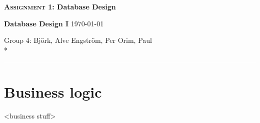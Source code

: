 \documentclass[a4paper, pagesize, parskip=half]{scrartcl}
\begin{document}
\Huge \textbf{\textsc{Assignment 1}: Database Design}

\Large \textbf{Database Design I} \quad \large \today

\normalsize Group 4: \quad Björk, Alve  \quad Engström, Per \quad Orim, Paul \\*
\rule{\textwidth}{1pt}

\bigskip

\section*{Business logic}

<business stuff>
\end{document}
